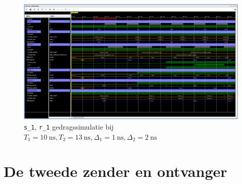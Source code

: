 \documentclass[titlepage]{article}
\begin{document}
\begin{figure}[htpb]
    \centering
    \includegraphics[trim={0 100px 0 0}, clip, width =\linewidth]{sr1_gedragssimulatie_10_13_1_2.PNG}
    \caption{\texttt{s\_1}, \texttt{r\_1} gedragssimulatie bij \(T_1 = \SI{10}{\nano\second}, T_2 = \SI{13}{\nano\second}, \Delta_1 = \SI{1}{\nano\second}, \Delta_2 = \SI{2}{\nano\second} \)}
    \label{fig:sr1_behav_10_13_1_2}
\end{figure}

\clearpage

\section{De tweede zender en ontvanger}
\end{document}

